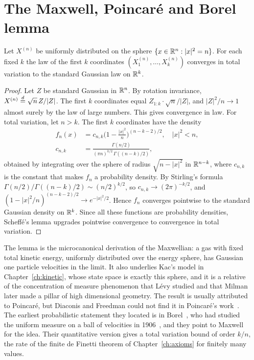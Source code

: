 \section{The Maxwell, Poincar\'e and Borel lemma}

\begin{theorem}
\label{thm:sphere_lemma}
Let $X^{(n)}$ be uniformly distributed on the sphere $\{x\in\mathbb{R}^n:|x|^2 = n\}$. For each fixed $k$ the law of the first $k$ coordinates $(X^{(n)}_1,\dots,X^{(n)}_k)$ converges in total variation to the standard Gaussian law on $\mathbb{R}^k$.
\end{theorem}

\begin{proof}
Let $Z$ be standard Gaussian in $\mathbb{R}^n$. By rotation invariance, $X^{(n)}\stackrel{d}{=}\sqrt n\,Z/|Z|$. The first $k$ coordinates equal $Z_{1:k}\cdot\sqrt{n}/|Z|$, and $|Z|^2/n\to1$ almost surely by the law of large numbers. This gives convergence in law. For total variation, let $n>k$. The first $k$ coordinates have the density
\[
\begin{aligned}f_n(x) &= c_{n,k}\Big(1-\frac{|x|^2}{n}\Big)^{(n-k-2)/2},\quad |x|^2<n,\\
c_{n,k} &= \frac{\Gamma(n/2)}{(\pi n)^{k/2}\,\Gamma((n-k)/2)},\end{aligned}
\]
obtained by integrating over the sphere of radius $\sqrt{n-|x|^2}$ in $\mathbb{R}^{n-k}$, where $c_{n,k}$ is the constant that makes $f_n$ a probability density. By Stirling's formula $\Gamma(n/2)/\Gamma((n-k)/2)\sim(n/2)^{k/2}$, so $c_{n,k}\to(2\pi)^{-k/2}$, and $(1-|x|^2/n)^{(n-k-2)/2}\to e^{-|x|^2/2}$. Hence $f_n$ converges pointwise to the standard Gaussian density on $\mathbb{R}^k$. Since all these functions are probability densities, Scheff\'e's lemma upgrades pointwise convergence to convergence in total variation.
\end{proof}

The lemma is the microcanonical derivation of the Maxwellian: a gas with fixed total kinetic energy, uniformly distributed over the energy sphere, has Gaussian one particle velocities in the limit. It also underlies Kac's model in Chapter~\ref{ch:kinetic}, whose state space is exactly this sphere, and it is a relative of the concentration of measure phenomenon that L\'evy studied and that Milman later made a pillar of high dimensional geometry. The result is usually attributed to Poincar\'e, but Diaconis and Freedman could not find it in Poincar\'e's work~\cite{diaconisfreedman1987}. The earliest probabilistic statement they located is in Borel~\cite{borel1914}, who had studied the uniform measure on a ball of velocities in 1906~\cite{borel1906}, and they point to Maxwell for the idea. Their quantitative version gives a total variation bound of order $k/n$, the rate of the finite de Finetti theorem of Chapter~\ref{ch:axioms} for finitely many values.

